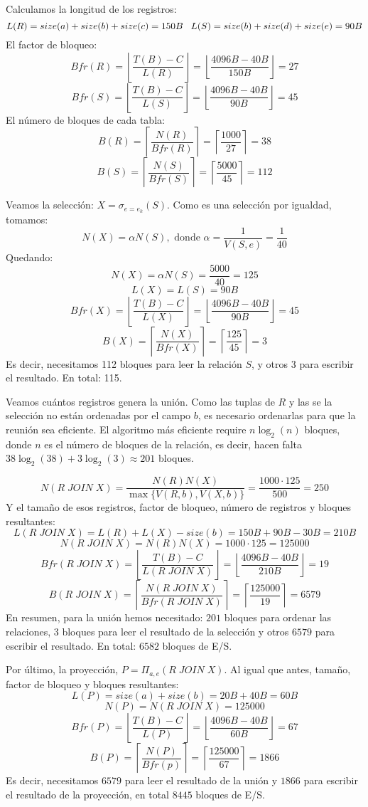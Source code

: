 \documentclass[12pt]{report}
\begin{document}
Calculamos la longitud de los registros:
\[
L(R)=size(a)+size(b)+size(c)=150B \;\;\; L(S)=size(b)+size(d)+size(e)=90B
\]
El factor de bloqueo:
\[
Bfr(R)=\left\lfloor\frac{T(B)-C}{L(R)}\right\rfloor=\left\lfloor\frac{4096B-40B}{150B}\right\rfloor=27
\]
\[
Bfr(S)=\left\lfloor\frac{T(B)-C}{L(S)}\right\rfloor=\left\lfloor\frac{4096B-40B}{90B}\right\rfloor=45
\]
El número de bloques de cada tabla:
\[
B(R)=\left\lceil\frac{N(R)}{Bfr(R)}\right\rceil=\left\lceil\frac{1000}{27}\right\rceil=38
\]
\[
B(S)=\left\lceil\frac{N(S)}{Bfr(S)}\right\rceil=\left\lceil\frac{5000}{45}\right\rceil=112
\]

Veamos la selección: $X=\sigma_{e=e_k}(S)$. Como es una selección por igualdad, tomamos:
\[
N(X)=\alpha N(S), \text{ donde } \alpha=\frac{1}{V(S,e)}=\frac{1}{40}
\]
Quedando:
\[
N(X)=\alpha N(S)=\frac{5000}{40}=125
\]
\[
L(X)=L(S)=90B
\]
\[
Bfr(X)=\left\lfloor\frac{T(B)-C}{L(X)}\right\rfloor=\left\lfloor\frac{4096B-40B}{90B}\right\rfloor=45
\]
\[
B(X)=\left\lceil\frac{N(X)}{Bfr(X)}\right\rceil=\left\lceil\frac{125}{45}\right\rceil=3
\]
Es decir, necesitamos 112 bloques para leer la relación $S$, y otros 3 para escribir el resultado. En total: 115.

Veamos cuántos registros genera la unión. Como las tuplas de $R$ y las se la selección no están ordenadas por el campo $b$, es necesario ordenarlas para que la reunión sea eficiente. El algoritmo más eficiente require $n\log_2(n)$ bloques, donde $n$ es el número de bloques de la relación, es decir, hacen falta $38\log_2(38)+3\log_2(3)\approx 201$ bloques.


\[
N(R\;JOIN\;X)=\frac{N(R)N(X)}{\max\{V(R,b),V(X,b)\}}= \frac{1000\cdot 125}{500}=250
\]
Y el tamaño de esos registros, factor de bloqueo, número de registros y bloques resultantes:
\[
L(R\;JOIN\;X)=L(R)+L(X)-size(b)=150B+90B-30B=210B
\]
\[
N(R\;JOIN\;X)=N(R)N(X)=1000\cdot 125 = 125000
\]
\[
Bfr(R\;JOIN\;X)=\left\lfloor\frac{T(B)-C}{L(R\;JOIN\;X)}\right\rfloor=\left\lfloor\frac{4096B-40B}{210B}\right\rfloor=19
\]
\[
B(R\;JOIN\;X)=\left\lceil\frac{N(R\;JOIN\;X)}{Bfr(R\;JOIN\;X)}\right\rceil=\left\lceil\frac{125000}{19}\right\rceil=6579
\]
En resumen, para la unión hemos necesitado: $201$ bloques para ordenar las relaciones, $3$ bloques para leer el resultado de la selección y otros $6579$ para escribir el resultado. En total: $6582$ bloques de E/S.

Por último, la proyección, $P=\Pi_{a,e}(R\;JOIN\;X)$. Al igual que antes, tamaño, factor de bloqueo y bloques resultantes:
\[
L(P)=size(a)+size(b)=20B+40B=60B
\]
\[
N(P)=N(R\;JOIN\;X)=125000
\]
\[
Bfr(P)=\left\lfloor\frac{T(B)-C}{L(P)}\right\rfloor=\left\lfloor\frac{4096B-40B}{60B}\right\rfloor=67
\]
\[
B(P)=\left\lceil\frac{N(P)}{Bfr(p)}\right\rceil=\left\lceil\frac{125000}{67}\right\rceil=1866
\]
Es decir, necesitamos $6579$ para leer el resultado de la unión y $1866$ para escribir el resultado de la proyección, en total $8445$ bloques de E/S.
\end{document}

